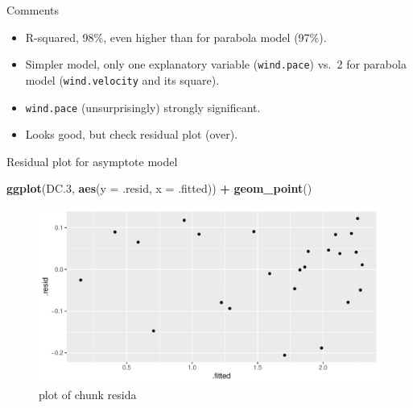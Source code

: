 \documentclass[
  ignorenonframetext,
]{beamer}
\newenvironment{Shaded}{\begin{snugshade}}{\end{snugshade}}
\newcommand{\DataTypeTok}[1]{\textcolor[rgb]{0.13,0.29,0.53}{#1}}
\newcommand{\FloatTok}[1]{\textcolor[rgb]{0.00,0.00,0.81}{#1}}
\newcommand{\KeywordTok}[1]{\textcolor[rgb]{0.13,0.29,0.53}{\textbf{#1}}}
\newcommand{\NormalTok}[1]{#1}
\newcommand{\OperatorTok}[1]{\textcolor[rgb]{0.81,0.36,0.00}{\textbf{#1}}}
\newcommand{\StringTok}[1]{\textcolor[rgb]{0.31,0.60,0.02}{#1}}
\providecommand{\tightlist}{%
  \setlength{\itemsep}{0pt}\setlength{\parskip}{0pt}}
\begin{document}
\begin{frame}[fragile]{Comments}
\protect\hypertarget{comments-16}{}

\begin{itemize}
\tightlist
\item
  R-squared, 98\%, even higher than for parabola model (97\%).
\item
  Simpler model, only one explanatory variable (\texttt{wind.pace})
  vs.~2 for parabola model (\texttt{wind.velocity} and its square).
\item
  \texttt{wind.pace} (unsurprisingly) strongly significant.
\item
  Looks good, but check residual plot (over).
\end{itemize}

\end{frame}

\begin{frame}[fragile]{Residual plot for asymptote model}
\protect\hypertarget{residual-plot-for-asymptote-model}{}

\begin{Shaded}
\begin{Highlighting}[]
\KeywordTok{ggplot}\NormalTok{(DC}\FloatTok{.3}\NormalTok{, }\KeywordTok{aes}\NormalTok{(}\DataTypeTok{y =}\NormalTok{ .resid, }\DataTypeTok{x =}\NormalTok{ .fitted)) }\OperatorTok{+}\StringTok{ }\KeywordTok{geom_point}\NormalTok{()}
\end{Highlighting}
\end{Shaded}

\begin{figure}
\centering
\includegraphics{figure/resida-1.pdf}
\caption{plot of chunk resida}
\end{figure}

\end{frame}
\end{document}
